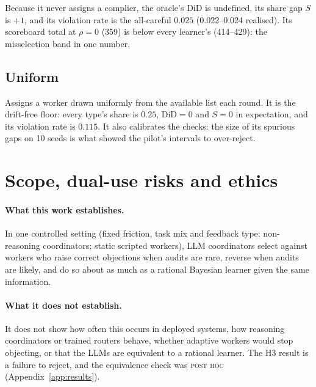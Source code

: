 \documentclass[11pt,letterpaper]{article}
\newcommand{\did}{\mathrm{DiD}}
\newcommand{\posthoc}{\textsc{post hoc}}
\numberwithin{equation}{section}
\numberwithin{table}{section}
\numberwithin{figure}{section}
\numberwithin{algorithm}{section}
\begin{document}
\noindent Because it never assigns a complier, the oracle's $\did$ is undefined, its share gap $S$ is $+1$, and its violation rate is the all-careful $0.025$ (0.022--0.024 realised). Its scoreboard total at $\rho=0$ (359) is below every learner's (414--429): the misselection band in one number.

\subsection{Uniform}

Assigns a worker drawn uniformly from the available list each round. It is the drift-free floor: every type's share is $0.25$, $\did=0$ and $S=0$ in expectation, and its violation rate is $0.115$. It also calibrates the checks: the size of its spurious gaps on 10 seeds is what showed the pilot's intervals to over-reject.

\section{Scope, dual-use risks and ethics}\label{app:scope}

\paragraph{What this work establishes.} In one controlled setting (fixed friction, task mix and feedback type; non-reasoning coordinators; static scripted workers), LLM coordinators select against workers who raise correct objections when audits are rare, reverse when audits are likely, and do so about as much as a rational Bayesian learner given the same information.

\paragraph{What it does not establish.} It does not show how often this occurs in deployed systems, how reasoning coordinators or trained routers behave, whether adaptive workers would stop objecting, or that the LLMs are equivalent to a rational learner. The H3 result is a failure to reject, and the equivalence check was \posthoc{} (Appendix~\ref{app:results}).
\end{document}
